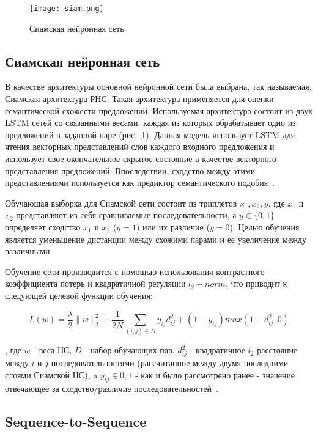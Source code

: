 
\begin{figure}[htbp]
\centering
\texttt{[image: siam.png]}
\caption{Сиамская нейронная сеть}
\label{fig:siam_mod}
\end{figure}

\subsection{Сиамская нейронная сеть}

В качестве архитектуры основной нейронной сети была выбрана, так называемая, Сиамская архитектура РНС. Такая архитектура применяется для оценки семантической схожести предложений. Используемая архитектура состоит из двух LSTM сетей со связанными весами, каждая из которых обрабатывает одно из предложений в заданной паре (рис.~\ref{fig:siam_mod}). Данная модель использует LSTM для чтения векторных представлений слов каждого входного предложения и использует свое окончательное скрытое состояние в качестве векторного представления предложений. Впоследствии, сходство между этими представлениями используется как предиктор семантического подобия~\cite{siam}.

Обучающая выборка для Сиамской сети состоит из триплетов \(x_1, x_2, y\), где \(x_1\) и \(x_2\) представляют из себя сравниваемые последовательности, а \(y \in \{0,1\}\) определяет сходство \(x_1\) и \(x_2\) (\(y = 1\)) или их различие (\(y = 0\)). Целью обучения является уменьшение дистанции между схожими парами и ее увеличение между различными.

Обучение сети производится с помощью использования контрастного коэффициента потерь и квадратичной регуляции \(l_2-norm\), что приводит к следующей целевой функции обучения:

\begin{equation}
\label{eq:contrastive}
L(w)=\frac{\lambda}{2}\|w\|_2^2+\frac{1}{2N}\sum_{(i,j) \in D}y_{ij}d_{ij}^2+(1-y_{ij}) max(1-d_{ij}^2,0)
\end{equation}

, где \(w\) - веса НС, \(D\) - набор обучающих пар, \(d_{ij}^2\) - квадратичное \(l_2\) расстояние между \(i\) и \(j\) последовательностями (рассчитанное между двумя последними слоями Сиамской НС), a \(y_{ij} \in {0,1}\) - как и было рассмотрено ранее - значение отвечающее за сходство/различие последовательностей~\cite{siam}.

\subsection{Sequence-to-Sequence}

